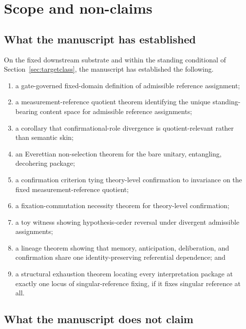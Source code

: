 \section{Scope and non-claims}
\label{sec:nonclaims}

\subsection{What the manuscript has established}

On the fixed downstream substrate and within the standing conditional of
Section~\ref{sec:targetclass}, the manuscript has established the following.
\begin{enumerate}
    \item a gate-governed fixed-domain definition of admissible reference assignment;
    \item a measurement-reference quotient theorem identifying the unique standing-bearing content
    space for admissible reference assignments;
    \item a corollary that confirmational-role divergence is quotient-relevant rather than semantic skin;
    \item an Everettian non-selection theorem for the bare unitary, entangling, decohering package;
    \item a confirmation criterion tying theory-level confirmation to invariance on the fixed
    measurement-reference quotient;
    \item a fixation-commutation necessity theorem for theory-level confirmation;
    \item a toy witness showing hypothesis-order reversal under divergent admissible assignments;
    \item a lineage theorem showing that memory, anticipation, deliberation, and confirmation share
    one identity-preserving referential dependence; and
    \item a structural exhaustion theorem locating every interpretation package at exactly one locus of
    singular-reference fixing, if it fixes singular reference at all.
\end{enumerate}

\subsection{What the manuscript does not claim}

